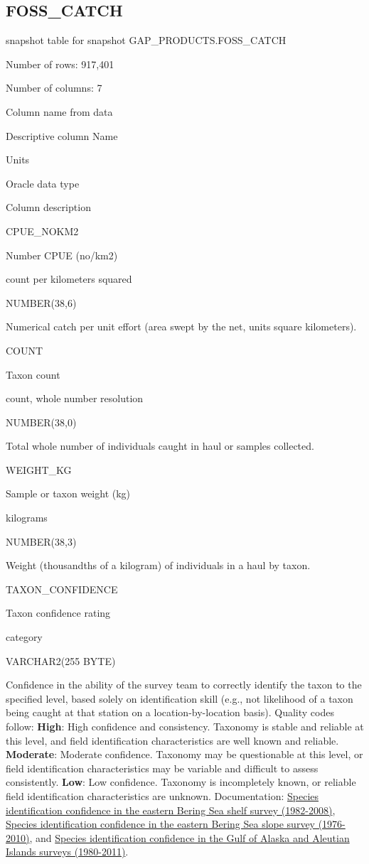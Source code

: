 \documentclass[
  letterpaper,
  oneside,
  open=any]{scrbook}
\begin{document}
\subsection{FOSS\_CATCH}\label{foss_catch}

snapshot table for snapshot GAP\_PRODUCTS.FOSS\_CATCH

Number of rows: 917,401

Number of columns: 7

Column name from data

Descriptive column Name

Units

Oracle data type

Column description

CPUE\_NOKM2

Number CPUE (no/km2)

count per kilometers squared

NUMBER(38,6)

Numerical catch per unit effort (area swept by the net, units square
kilometers).

COUNT

Taxon count

count, whole number resolution

NUMBER(38,0)

Total whole number of individuals caught in haul or samples collected.

WEIGHT\_KG

Sample or taxon weight (kg)

kilograms

NUMBER(38,3)

Weight (thousandths of a kilogram) of individuals in a haul by taxon.

TAXON\_CONFIDENCE

Taxon confidence rating

category

VARCHAR2(255 BYTE)

Confidence in the ability of the survey team to correctly identify the
taxon to the specified level, based solely on identification skill
(e.g., not likelihood of a taxon being caught at that station on a
location-by-location basis). Quality codes follow: \textbf{High}: High
confidence and consistency. Taxonomy is stable and reliable at this
level, and field identification characteristics are well known and
reliable. \textbf{Moderate}: Moderate confidence. Taxonomy may be
questionable at this level, or field identification characteristics may
be variable and difficult to assess consistently. \textbf{Low}: Low
confidence. Taxonomy is incompletely known, or reliable field
identification characteristics are unknown. Documentation:
\href{http://apps-afsc.fisheries.noaa.gov/Publications/ProcRpt/PR2009-04.pdf}{Species
identification confidence in the eastern Bering Sea shelf survey
(1982-2008)},
\href{http://apps-afsc.fisheries.noaa.gov/Publications/ProcRpt/PR2014-05.pdf}{Species
identification confidence in the eastern Bering Sea slope survey
(1976-2010)}, and
\href{http://apps-afsc.fisheries.noaa.gov/Publications/ProcRpt/PR2014-01.pdf}{Species
identification confidence in the Gulf of Alaska and Aleutian Islands
surveys (1980-2011)}.
\end{document}
